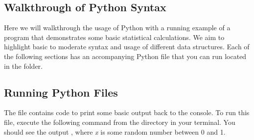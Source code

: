 \subsection{Walkthrough of Python Syntax}

Here we will walkthrough the usage of Python with a running example of a program that demonstrates some basic statistical calculations. We aim to highlight basic to moderate syntax and usage of different data structures.
Each of the following sections has an accompanying Python file that you can run located in the  folder.

\subsection{Running Python Files}

The file  contains code to print some basic output back to the console.
To run this file, execute the following command from the  directory in your terminal.
You should see the output , where \textit{x} is some random number between 0 and 1.





